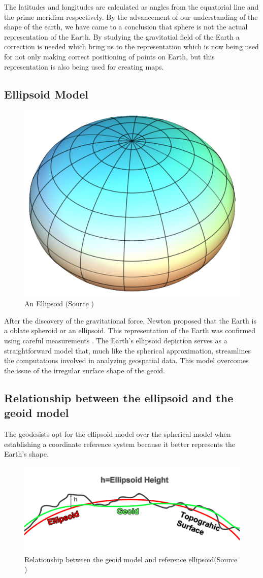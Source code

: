The latitudes and longitudes are calculated as angles from the equatorial line and the prime meridian respectively. By the advancement of our understanding of the shape of the earth, we have came to a conclusion that sphere is not the actual representation of the Earth. By studying the gravitatial field of the Earth a
correction is needed which bring us to the representation which is now being used for not only making correct positioning of points on Earth, but this representation is also being used for creating maps.

\subsection{Ellipsoid Model}

\begin{figure}[h]
    \centering
    \includegraphics[width=0.4\linewidth]{figures/chapter-2/elipsoid.png}
    \caption{An Ellipsoid (Source \cite{GISGEO_Ellipsoid}) }
    \label{fig:ellipsoid-image}
\end{figure}
After the discovery of the gravitational force, Newton proposed that the Earth is a oblate spheroid or an ellipsoid. This representation of the Earth was confirmed using careful measurements \cite{Osserman2006-ys}. The Earth's ellipsoid depiction serves as a straightforward model that, much like the spherical approximation, streamlines the computations involved in analyzing geospatial data.
This model overcomes the issue of the irregular surface shape of the geoid.

\subsection{Relationship between the ellipsoid and the geoid model}
The geodesists opt for the ellipsoid model over the spherical model when establishing a coordinate reference system because it better represents the Earth's shape.

\begin{figure}[h]
    \centering
    \includegraphics[width=0.6\linewidth]{figures/chapter-2/Ellipsoid-height-relation.png}
    \caption{Relationship between the geoid model and reference ellipsoid(Source \cite{GISGEO_Ellipsoid}) }
    \label{fig:relationship-ellipsoid-geoid-image}
\end{figure}

